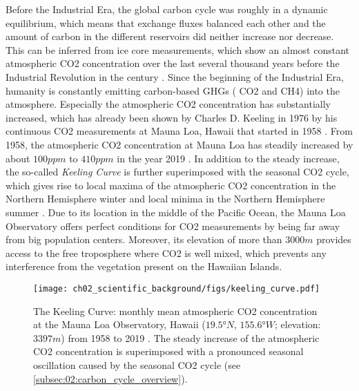 Before the Industrial Era, the global carbon cycle was roughly in a dynamic
equilibrium, which means that exchange fluxes balanced each other and the
amount of carbon in the different reservoirs did neither increase nor decrease.
This can be inferred from ice core measurements, which show an almost constant
atmospheric \ac{CO2} concentration over the last several thousand years before
the Industrial Revolution in the  century \autocite{Ciais2013}. Since
the beginning of the Industrial Era, humanity is constantly emitting
carbon-based \acp{GHG} (\eg{} \ac{CO2} and \ac{CH4}) into the atmosphere.
Especially the atmospheric \ac{CO2} concentration has substantially increased,
which has already been shown by Charles D. Keeling in 1976 by his continuous
\ac{CO2} measurements at Mauna Loa, Hawaii that started in 1958
. From 1958, the
atmospheric \ac{CO2} concentration at Mauna Loa has steadily increased by about
$100 \unit{ppm}$ to $410 \unit{ppm}$ in the year 2019 \autocite{Keeling2005}.
In addition to the steady increase, the so-called \emph{Keeling Curve} is
further superimposed with the seasonal \ac{CO2} cycle, which gives rise to
local maxima of the atmospheric \ac{CO2} concentration in the Northern
Hemisphere winter and local minima in the Northern Hemisphere summer
. Due to
its location in the middle of the Pacific Ocean, the Mauna Loa Observatory
offers perfect conditions for \ac{CO2} measurements by being far away from big
population centers. Moreover, its elevation of more than $3000 \unit{m}$
provides access to the free troposphere where \ac{CO2} is well mixed, which
prevents any interference from the vegetation present on the Hawaiian Islands.

\begin{figure}[t]
  \centering
  \texttt{[image: 
    ch02\_scientific\_background/figs/keeling\_curve.pdf]}
  \caption[
    The Keeling Curve.
  ]{
    The Keeling Curve: monthly mean atmospheric \acs{CO2} concentration at the
    Mauna Loa Observatory, Hawaii ($19.5 \unit{\degree N}$, $155.6
    \unit{\degree W}$; elevation: $3397 \unit{m}$) from 1958 to 2019
    \autocite{Keeling2005}. The steady increase of the atmospheric \acs{CO2}
    concentration is superimposed with a pronounced seasonal oscillation caused
    by the seasonal \acs{CO2} cycle (see
    \cref{subsec:02:carbon_cycle_overview}).
  }
  \label{fig:02:keeling_curve}
\end{figure}

